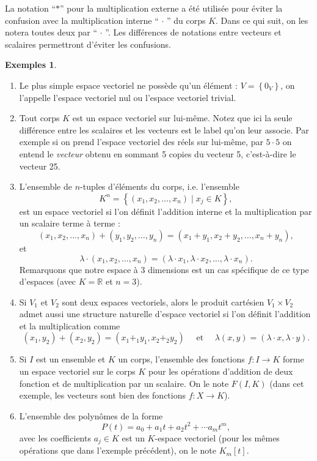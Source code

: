 \documentclass[oneside,12pt,french,table]{book}
\newcommand{\R}{\mathbb{R}}
\theoremstyle{definition}
\theoremstyle{definition}
\newtheorem*{examples}{Exemples}
\theoremstyle{definition}
\begin{document}
La notation ``$*$'' pour la multiplication externe a été utilisée pour éviter la confusion avec la multiplication interne ``$\, \cdot \,$'' du corps $K$. Dans ce qui suit, on les notera toutes deux par ``$\, \cdot \,$''. Les différences de notations entre vecteurs et scalaires permettront d'éviter les confusions.
\begin{examples} \hspace{1em}
        \begin{enumerate}[(i.)]
            \item Le plus simple espace vectoriel ne possède qu'un élément : $V=\left\{0_{V}\right\}$, on l'appelle l'espace vectoriel nul ou l'espace vectoriel trivial.
            \item Tout corps $K$ est un espace vectoriel sur lui-même. Notez que ici la seule différence entre les scalaires et les vecteurs est le label qu'on leur associe. Par exemple si on prend l'espace vectoriel des réels sur lui-même, par $5\cdot 5$ on entend le \textit{vecteur} obtenu en sommant 5 copies du vecteur 5, c'est-à-dire le vecteur 25.
            \item L'ensemble de $n$-tuples d'éléments du corps, i.e. l'ensemble
                $$
                K^{n}=\left\{\left(x_{1}, x_{2}, \ldots, x_{n}\right) \mid x_{j} \in K\right\},
                $$
                est un espace vectoriel si l'on définit l'addition interne et la multiplication par un scalaire terme à terme :
                $$
                \left(x_{1}, x_{2}, \ldots, x_{n}\right)+\left(y_{1}, y_{2}, \ldots, y_{n}\right)=\left(x_{1}+y_{1}, x_{2}+y_{2}, \ldots, x_{n}+y_{n}\right),
                $$
                et
                $$
                \lambda \cdot\left(x_{1}, x_{2}, \ldots, x_{n}\right)=\left(\lambda \cdot x_{1}, \lambda \cdot x_{2}, \ldots, \lambda \cdot x_{n}\right).
                $$
                Remarquons que notre espace à 3 dimensions est un cas spécifique de ce type d'espaces (avec $K=\R$ et $n=3$).
            \item Si $V_{1}$ et $V_{2}$ sont deux espaces vectoriels, alors le produit cartésien $V_{1} \times V_{2}$ admet aussi une structure naturelle d'espace vectoriel si l'on définit l'addition et la multiplication comme
            $$
                (x_1,y_2) + (x_2,y_2) = (x_1+_1y_1,x_2+_2y_2)\quad \text{ et } \quad \lambda(x,y)=(\lambda\cdot x,\lambda\cdot y).
            $$
            \item Si $I$ est un ensemble et $K$ un corps, l'ensemble des fonctions $f: I \rightarrow K$ forme un espace vectoriel sur le corps $K$ pour les opérations d'addition de deux fonction et de multiplication par un scalaire. On le note $F(I, K)$ (dans cet exemple, les vecteurs sont bien des fonctions $f: X \rightarrow K$).
            \item L'ensemble des polynômes de la forme
            $$
            P(t)=a_{0}+a_{1} t+a_{2} t^{2}+\cdots a_{m} t^{m},
            $$
            avec les coefficients $a_j\in K$ est un $K$-espace vectoriel (pour les mêmes opérations que dans l'exemple précédent), on le note $K_m[t]$.
        \end{enumerate}
\end{examples}
\end{document}
